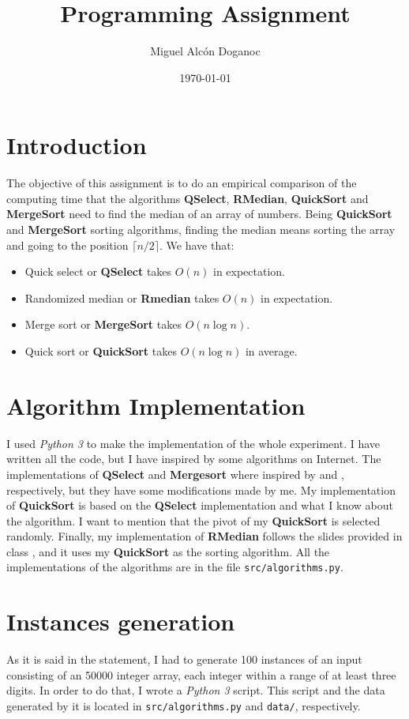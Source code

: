 \documentclass[letterpaper,12pt]{article}
\newcommand{\code}[1]{\texttt{#1}}
\begin{document}
\title{Programming Assignment}
\author{Miguel Alcón Doganoc}
\date{\today}
\maketitle

\section{Introduction}
The objective of this assignment is to do an empirical comparison of the computing time that the algorithms \textbf{QSelect}, \textbf{RMedian}, \textbf{QuickSort} and \textbf{MergeSort} need to find the median of an array of numbers. Being \textbf{QuickSort} and \textbf{MergeSort} sorting algorithms, finding the median means sorting the array and going to the position $\lceil n/2 \rceil $. We have that:
\begin{itemize}
    \item Quick select or \textbf{QSelect} takes $O(n)$ in expectation.
    \item Randomized median or \textbf{Rmedian} takes $O(n)$ in expectation.
    \item Merge sort or \textbf{MergeSort} takes $O(n \log n)$.
    \item Quick sort or \textbf{QuickSort} takes $O(n \log n)$ in average.
\end{itemize}

\section{Algorithm Implementation}
I used \textit{Python 3} to make the implementation of the whole experiment. I have written all the code, but I have inspired by some algorithms on Internet. The implementations of \textbf{QSelect} and \textbf{Mergesort} where inspired by \cite{qselect} and \cite{mergesort}, respectively, but they have some modifications made by me. My implementation of \textbf{QuickSort} is based on the \textbf{QSelect} implementation and what I know about the algorithm. I want to mention that the pivot of my \textbf{QuickSort} is selected randomly. Finally, my implementation of \textbf{RMedian} follows the slides provided in class \cite{slides}, and it uses my \textbf{QuickSort} as the sorting algorithm. All the implementations of the algorithms are in the file \code{src/algorithms.py}.

\section{Instances generation}
As it is said in the statement, I had to generate 100 instances of an input consisting of an 50000 integer array, each integer within a range of at least three digits. In order to do that, I wrote a \textit{Python 3} script. This script and the data generated by it is located in \code{src/algorithms.py} and \code{data/}, respectively. \\
\end{document}
